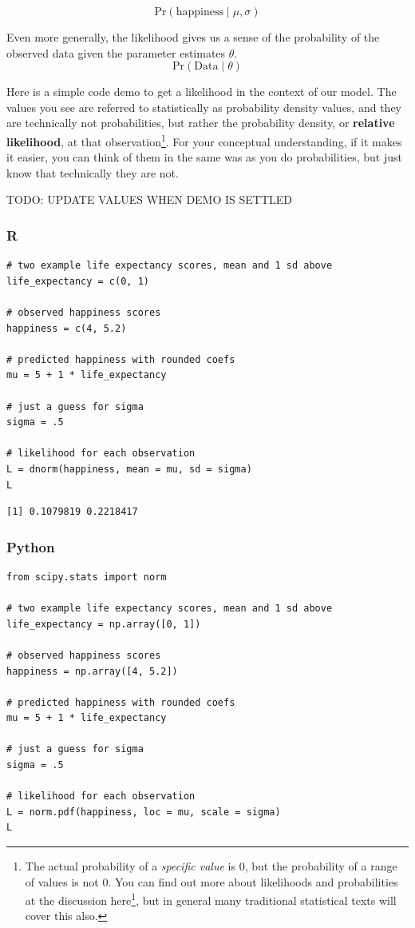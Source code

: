 \documentclass[
  letterpaper,
]{krantz}
\DeclareRobustCommand{\href}[2]{#2\footnote{\url{#1}}}
\begin{document}
\[
\textrm{Pr}(\textrm{happiness} \mid \mu, \sigma)
\]

Even more generally, the likelihood gives us a sense of the probability
of the observed data given the parameter estimates \(\theta\). \[
\textrm{Pr}(\textrm{Data} \mid \theta)
\]

Here is a simple code demo to get a likelihood in the context of our
model. The values you see are referred to statistically as probability
density values, and they are technically not probabilities, but rather
the probability density, or \textbf{relative likelihood}, at that
observation\footnote{The actual probability of a \emph{specific value}
  is 0, but the probability of a range of values is not 0. You can find
  out more about likelihoods and probabilities at the discussion
  \href{https://stats.stackexchange.com/questions/2641/what-is-the-difference-between-likelihood-and-probability}{here},
  but in general many traditional statistical texts will cover this
  also.}. For your conceptual understanding, if it makes it easier, you
can think of them in the same was as you do probabilities, but just know
that technically they are not.

TODO: UPDATE VALUES WHEN DEMO IS SETTLED

\subsubsection{R}

\begin{verbatim}
# two example life expectancy scores, mean and 1 sd above
life_expectancy = c(0, 1)

# observed happiness scores
happiness = c(4, 5.2)

# predicted happiness with rounded coefs
mu = 5 + 1 * life_expectancy

# just a guess for sigma
sigma = .5

# likelihood for each observation
L = dnorm(happiness, mean = mu, sd = sigma)
L
\end{verbatim}

\begin{verbatim}
[1] 0.1079819 0.2218417
\end{verbatim}

\subsubsection{Python}

\begin{verbatim}
from scipy.stats import norm

# two example life expectancy scores, mean and 1 sd above
life_expectancy = np.array([0, 1])

# observed happiness scores
happiness = np.array([4, 5.2])

# predicted happiness with rounded coefs
mu = 5 + 1 * life_expectancy

# just a guess for sigma
sigma = .5

# likelihood for each observation
L = norm.pdf(happiness, loc = mu, scale = sigma)
L
\end{verbatim}
\end{document}
